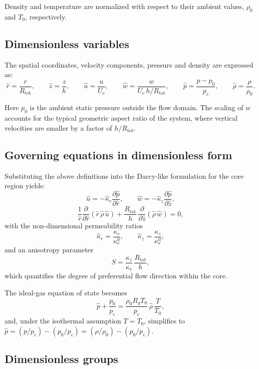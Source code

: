 \documentclass[11pt,a4paper]{article}
\begin{document}
Density and temperature are normalized with respect to their ambient values, \(\rho_0\) and \(T_0\), respectively.

\subsection{Dimensionless variables}

The spatial coordinates, velocity components, pressure and density are expressed as:
\[
\hat{r} = \frac{r}{R_{\mathrm{tot}}}, \qquad
\hat{z} = \frac{z}{h}, \qquad
\hat{u} = \frac{u}{U_c}, \qquad
\hat{w} = \frac{w}{U_c \, h / R_{\mathrm{tot}}}, \qquad
\hat{p} = \frac{p - p_0}{p_c}, \qquad
\hat{\rho} = \frac{\rho}{\rho_0}.
\]

Here \(p_0\) is the ambient static pressure outside the flow domain.  
The scaling of \(w\) accounts for the typical geometric aspect ratio of the system, where vertical velocities are smaller by a factor of \(h/R_{\mathrm{tot}}\).

\subsection{Governing equations in dimensionless form}

Substituting the above definitions into the Darcy-like formulation for the core region yields:
\[
\hat{u} = -\hat{\kappa}_r \frac{\partial \hat{p}}{\partial \hat{r}}, 
\qquad
\hat{w} = -\hat{\kappa}_z \frac{\partial \hat{p}}{\partial \hat{z}},
\]
\[
\frac{1}{\hat{r}} \frac{\partial}{\partial \hat{r}} 
\left( \hat{r}\, \hat{\rho} \, \hat{u} \right)
+ \frac{R_{\mathrm{tot}}}{h} \,
\frac{\partial}{\partial \hat{z}} 
\left( \hat{\rho} \, \hat{w} \right)
= 0,
\]
with the non-dimensional permeability ratios
\[
\hat{\kappa}_r = \frac{\kappa_r}{\kappa_r^0}, 
\qquad 
\hat{\kappa}_z = \frac{\kappa_z}{\kappa_r^0}, 
\]
and an anisotropy parameter
\[
S = \frac{\kappa_z}{\kappa_r} \, \frac{R_{\mathrm{tot}}}{h},
\]
which quantifies the degree of preferential flow direction within the core.

The ideal-gas equation of state becomes
\[
\hat{p} + \frac{p_0}{p_c} = \frac{\rho_0 R_g T_0}{p_c} 
\, \hat{\rho} \, \frac{T}{T_0},
\]
and, under the isothermal assumption \(T = T_0\), simplifies to 
\(\hat{p} = (p/p_c) - (p_0/p_c) = (\rho / \rho_0) - (p_0/p_c)\).

\subsection{Dimensionless groups}
\end{document}
